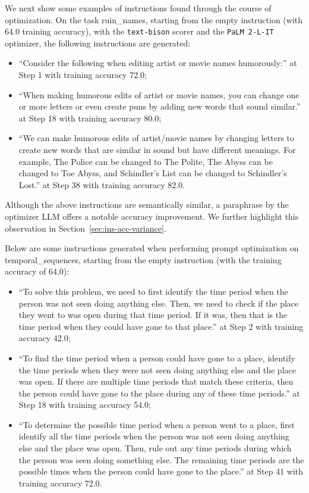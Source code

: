 We next show some examples of instructions found through the course of optimization.
On the task ruin\_names, starting from the empty instruction (with 64.0 training accuracy), with the \texttt{text-bison} scorer and the \texttt{PaLM 2-L-IT} optimizer, the following instructions are generated:
\begin{itemize}[leftmargin=2em,topsep=0pt,partopsep=1ex,parsep=0ex]
\item ``Consider the following when editing artist or movie names humorously:'' at Step 1 with training accuracy 72.0;
\item ``When making humorous edits of artist or movie names, you can change one or more letters or even create puns by adding new words that sound similar.'' at Step 18 with training accuracy 80.0;
\item ``We can make humorous edits of artist/movie names by changing letters to create new words that are similar in sound but have different meanings. For example, The Police can be changed to The Polite, The Abyss can be changed to Toe Abyss, and Schindler’s List can be changed to Schindler’s Lost.'' at Step 38 with training accuracy 82.0.
\end{itemize}
Although the above instructions are semantically similar, a paraphrase by the optimizer LLM offers a notable accuracy improvement. We further highlight this observation in Section~\ref{sec:ins-acc-variance}.

Below are some instructions generated when performing prompt optimization on temporal\_sequences, starting from the empty instruction (with the training accuracy of 64.0):
\begin{itemize}[leftmargin=2em,topsep=0pt,partopsep=1ex,parsep=0ex]
\item ``To solve this problem, we need to first identify the time period when the person was not seen doing anything else. Then, we need to check if the place they went to was open during that time period. If it was, then that is the time period when they could have gone to that place.'' at Step 2 with training accuracy 42.0;
\item ``To find the time period when a person could have gone to a place, identify the time periods when they were not seen doing anything else and the place was open. If there are multiple time periods that match these criteria, then the person could have gone to the place during any of these time periods.'' at Step 18 with training accuracy 54.0;
\item ``To determine the possible time period when a person went to a place, first identify all the time periods when the person was not seen doing anything else and the place was open. Then, rule out any time periods during which the person was seen doing something else. The remaining time periods are the possible times when the person could have gone to the place.'' at Step 41 with training accuracy 72.0.
\end{itemize}

